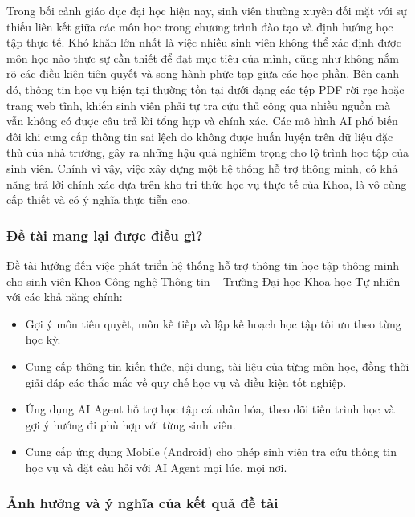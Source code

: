 \documentclass{article}[13pt]
\begin{document}
{    Trong bối cảnh giáo dục đại học hiện nay, sinh viên thường xuyên đối mặt với sự thiếu liên kết giữa các môn học trong chương trình đào tạo và định hướng học tập thực tế. Khó khăn lớn nhất là việc nhiều sinh viên không thể xác định được môn học nào thực sự cần thiết để đạt mục tiêu của mình, cũng như không nắm rõ các điều kiện tiên quyết và song hành phức tạp giữa các học phần. Bên cạnh đó, thông tin học vụ hiện tại thường tồn tại dưới dạng các tệp PDF rời rạc hoặc trang web tĩnh, khiến sinh viên phải tự tra cứu thủ công qua nhiều nguồn mà vẫn không có được câu trả lời tổng hợp và chính xác. Các mô hình AI phổ biến đôi khi cung cấp thông tin sai lệch do không được huấn luyện trên dữ liệu đặc thù của nhà trường, gây ra những hậu quả nghiêm trọng cho lộ trình học tập của sinh viên. Chính vì vậy, việc xây dựng một hệ thống hỗ trợ thông minh, có khả năng trả lời chính xác dựa trên kho tri thức học vụ thực tế của Khoa, là vô cùng cấp thiết và có ý nghĩa thực tiễn cao.

    \subsubsection{Đề tài mang lại được điều gì?}

    Đề tài hướng đến việc phát triển hệ thống hỗ trợ thông tin học tập thông minh cho sinh viên Khoa Công nghệ Thông tin -- Trường Đại học Khoa học Tự nhiên với các khả năng chính:

    \begin{itemize}[label={--}, leftmargin=1.5em]
        \item Gợi ý môn tiên quyết, môn kế tiếp và lập kế hoạch học tập tối ưu theo từng học kỳ.
        \item Cung cấp thông tin kiến thức, nội dung, tài liệu của từng môn học, đồng thời giải đáp các thắc mắc về quy chế học vụ và điều kiện tốt nghiệp.
        \item Ứng dụng AI Agent hỗ trợ học tập cá nhân hóa, theo dõi tiến trình học và gợi ý hướng đi phù hợp với từng sinh viên.
        \item Cung cấp ứng dụng Mobile (Android) cho phép sinh viên tra cứu thông tin học vụ và đặt câu hỏi với AI Agent mọi lúc, mọi nơi.
    \end{itemize}

    \subsubsection{Ảnh hưởng và ý nghĩa của kết quả đề tài}

}
\end{document}
